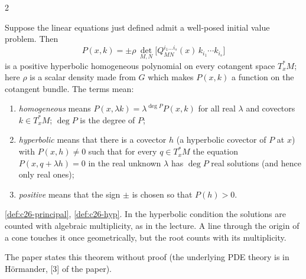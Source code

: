\begin{paracol}{2}
\begin{theorem}\label{thm:c29-hyp}
Suppose the linear equations just defined admit a well-posed initial value problem. Then
\[
  P(x,k)=\pm\rho\,\det_{M,N}\bigl[Q_{MN}^{i_1\dots i_s}(x)\,k_{i_1}\cdots k_{i_s}\bigr]
\]
is a positive hyperbolic homogeneous polynomial on every cotangent space $T^*_xM$; here $\rho$ is a scalar density made from $G$ which makes $P(x,k)$ a function on the cotangent bundle. The terms mean:
\begin{enumerate}
  \item \emph{homogeneous} means $P(x,\lambda k)=\lambda^{\deg P}P(x,k)$ for all real $\lambda$ and covectors $k\in T^*_xM$; $\deg P$ is the degree of $P$;
  \item \emph{hyperbolic} means that there is a covector $h$ (a hyperbolic covector of $P$ at $x$) with $P(x,h)\ne0$ such that for every $q\in T^*_xM$ the equation $P(x,q+\lambda h)=0$ in the real unknown $\lambda$ has $\deg P$ real solutions (and hence only real ones);
  \item \emph{positive} means that the sign $\pm$ is chosen so that $P(h)>0$.
\end{enumerate}
\end{theorem}
\begin{recall}
\cref{def:c26-principal}, \cref{def:c26-hyp}. In the hyperbolic condition the solutions are counted with algebraic multiplicity, as in the lecture. A line through the origin of a cone touches it once geometrically, but the root counts with its multiplicity.
\end{recall}
The paper states this theorem without proof (the underlying PDE theory is in H\"ormander, [3] of the paper).


\end{paracol}
